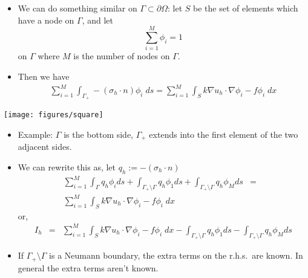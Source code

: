 \begin{frame}
      \begin{itemize}
      \item{
        We can do something similar on $\Gamma \subset \partial \Omega$: let $S$ be the set of elements
	which have a node on $\Gamma$, and let
	\begin{equation}
	  \nonumber
	  \sum_{i=1}^M \phi_i = 1 
	\end{equation}
	on $\Gamma$ where $M$ is the number of nodes on $\Gamma$.
      }
	
      \item{
	Then we have
	\begin{eqnarray}
	  \nonumber
	  \sum_{i=1}^M \int_{\Gamma_{+}}-\left(\sigma_h\cdot n\right)  \phi_i \;ds =
	  \sum_{i=1}^M \int_{S} k\nabla u_h \cdot \nabla \phi_i - f\phi_i \;dx 
	\end{eqnarray}
      }
      \end{itemize}
\end{frame}


\begin{frame}
  \begin{center}
    \texttt{[image: figures/square]}    
  \end{center}

      \begin{itemize}
      \item{
        Example: $\Gamma$ is the bottom side, $\Gamma_{+}$ extends into the first element
	of the two adjacent sides.
	}
      \end{itemize}
\end{frame}





\begin{frame}
      \begin{itemize}
      \item{We can rewrite this as, let $ q_h  := -\left(\sigma_h \cdot n\right)$
	\begin{eqnarray}
	  \nonumber
	  \sum_{i=1}^M \int_{\Gamma} q_h \phi_i ds +
	  \int_{\Gamma_{+} \setminus \Gamma} \!\!\!\!\!\!\! q_h \phi_1 ds +
	  \int_{\Gamma_{+} \setminus \Gamma} \!\!\!\!\!\!\! q_h \phi_M ds 
	  &=&\\
	  \nonumber
	  \sum_{i=1}^M \int_{S} k\nabla u_h \cdot \nabla \phi_i - f\phi_i \;dx 
	\end{eqnarray}
	or,
	\begin{eqnarray}
	  \nonumber
	  I_h  &=&
	  \sum_{i=1}^M \int_{S} k\nabla u_h \cdot \nabla \phi_i - f\phi_i \;dx -
	  \int_{\Gamma_{+} \setminus \Gamma} \!\!\!\!\!\!\! q_h \phi_1 ds -
	  \int_{\Gamma_{+} \setminus \Gamma} \!\!\!\!\!\!\! q_h \phi_M ds 
	\end{eqnarray}
	}

      \item{If $\Gamma_{+} \setminus \Gamma$ is a Neumann boundary, the extra terms on the r.h.s.\
	are known.  In general the extra terms aren't known.}
      \end{itemize}
\end{frame}
